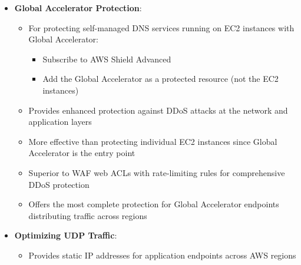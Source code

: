 \documentclass[11pt,a4paper]{report}
\begin{document}
\begin{itemize}
\begin{itemize}
\begin{itemize}
  \item Configure Network Load Balancers in multiple regions pointing to on-premises endpoints
  \item Create an AWS Global Accelerator and register the NLBs as endpoints
  \item Use a CNAME record pointing to the accelerator DNS name
\end{itemize}
  \item Provides improved performance by routing traffic over AWS global network
  \item Essential for UDP applications since CloudFront doesn't support UDP traffic
  \item Better than Application Load Balancers which don't support UDP protocols
  \item Perfect for applications that must remain on-premises but need global performance
  \item Specifically designed for applications requiring low latency, edge location routing, and static IP addresses
  \item Best solution for modified Linux kernels that only support UDP-based traffic
\end{itemize}
  \item \textbf{Global Accelerator Protection}:
\begin{itemize}
  \item For protecting self-managed DNS services running on EC2 instances with Global Accelerator:
\begin{itemize}
  \item Subscribe to AWS Shield Advanced
  \item Add the Global Accelerator as a protected resource (not the EC2 instances)
\end{itemize}
  \item Provides enhanced protection against DDoS attacks at the network and application layers
  \item More effective than protecting individual EC2 instances since Global Accelerator is the entry point
  \item Superior to WAF web ACLs with rate-limiting rules for comprehensive DDoS protection
  \item Offers the most complete protection for Global Accelerator endpoints distributing traffic across regions
\end{itemize}
  \item \textbf{Optimizing UDP Traffic}:
\begin{itemize}
  \item Provides static IP addresses for application endpoints across AWS regions

\end{itemize}
\end{itemize}
\end{document}
